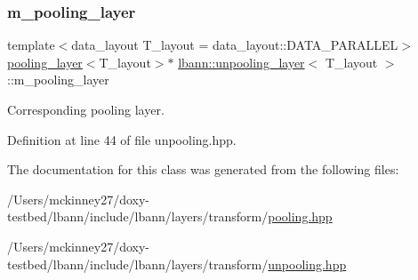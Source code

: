 \subsubsection{\texorpdfstring{m\+\_\+pooling\+\_\+layer}{m\_pooling\_layer}}
{\footnotesize\ttfamily template$<$data\+\_\+layout T\+\_\+layout = data\+\_\+layout\+::\+D\+A\+T\+A\+\_\+\+P\+A\+R\+A\+L\+L\+EL$>$ \\
\hyperlink{classlbann_1_1pooling__layer}{pooling\+\_\+layer}$<$T\+\_\+layout$>$$\ast$ \hyperlink{classlbann_1_1unpooling__layer}{lbann\+::unpooling\+\_\+layer}$<$ T\+\_\+layout $>$\+::m\+\_\+pooling\+\_\+layer\hspace{0.3cm}{\ttfamily [private]}}

Corresponding pooling layer. 

Definition at line 44 of file unpooling.\+hpp.



The documentation for this class was generated from the following files\+:\begin{DoxyCompactItemize}
\item 
/\+Users/mckinney27/doxy-\/testbed/lbann/include/lbann/layers/transform/\hyperlink{pooling_8hpp}{pooling.\+hpp}\item 
/\+Users/mckinney27/doxy-\/testbed/lbann/include/lbann/layers/transform/\hyperlink{unpooling_8hpp}{unpooling.\+hpp}\end{DoxyCompactItemize}
